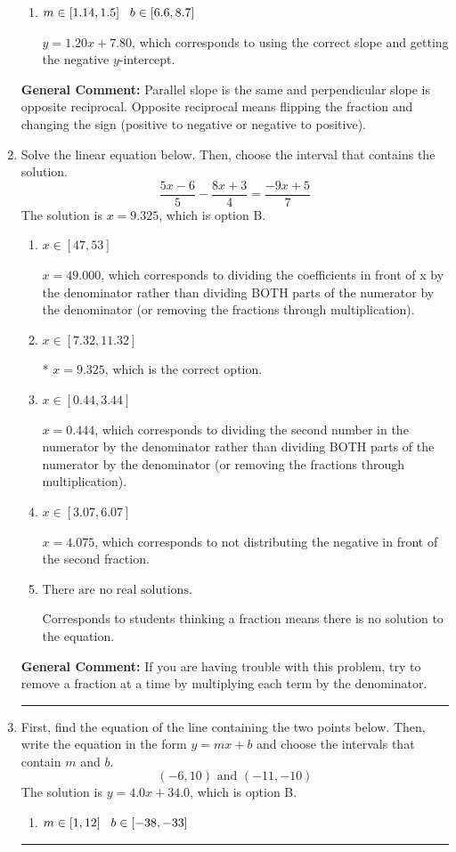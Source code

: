 \documentclass{extbook}[14pt]
\newcommand{\litem}[1]{\item #1

\rule{\textwidth}{0.4pt}}
\begin{document}
\begin{enumerate}
{\begin{enumerate}[label=\Alph*.]
 $y = -1.20x + 13.80$, which corresponds to using the negative slope.
\item \( m \in [1.14, 1.5] \hspace*{3mm} b \in [6.6, 8.7] \)

 $y = 1.20x + 7.80$, which corresponds to using the correct slope and getting the negative $y$-intercept.
\end{enumerate}

\textbf{General Comment:} Parallel slope is the same and perpendicular slope is opposite reciprocal. Opposite reciprocal means flipping the fraction and changing the sign (positive to negative or negative to positive).
}
\litem{
Solve the linear equation below. Then, choose the interval that contains the solution.
\[ \frac{5x -6}{5} - \frac{8x + 3}{4} = \frac{-9x + 5}{7} \]The solution is \( x = 9.325 \), which is option B.\begin{enumerate}[label=\Alph*.]
\item \( x \in [47, 53] \)

 $x = 49.000$, which corresponds to dividing the coefficients in front of x by the denominator rather than dividing BOTH parts of the numerator by the denominator (or removing the fractions through multiplication).
\item \( x \in [7.32, 11.32] \)

* $x = 9.325$, which is the correct option.
\item \( x \in [0.44, 3.44] \)

 $x = 0.444$, which corresponds to dividing the second number in the numerator by the denominator rather than dividing BOTH parts of the numerator by the denominator (or removing the fractions through multiplication).
\item \( x \in [3.07, 6.07] \)

 $x = 4.075$, which corresponds to not distributing the negative in front of the second fraction.
\item \( \text{There are no real solutions.} \)

Corresponds to students thinking a fraction means there is no solution to the equation.
\end{enumerate}

\textbf{General Comment:} If you are having trouble with this problem, try to remove a fraction at a time by multiplying each term by the denominator.
}
\litem{
First, find the equation of the line containing the two points below. Then, write the equation in the form $ y=mx+b $ and choose the intervals that contain $m$ and $b$.
\[ (-6, 10) \text{ and } (-11, -10) \]The solution is \( y = 4.0x + 34.0 \), which is option B.\begin{enumerate}[label=\Alph*.]
\item \( m \in [1, 12] \hspace*{3mm} b \in [-38, -33] \)


\end{enumerate}}
\end{enumerate}
\end{document}
